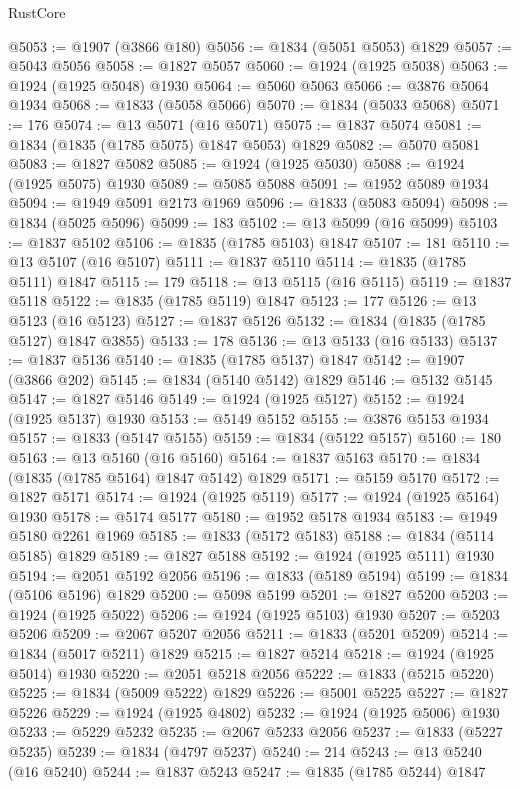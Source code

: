 \begin{lexlean}{RustCore}
\begin{coremodule}
@5053 := @1907 (@3866 @180)
@5056 := @1834 (@5051 @5053) @1829
@5057 := @5043 @5056
@5058 := @1827 @5057
@5060 := @1924 (@1925 @5038)
@5063 := @1924 (@1925 @5048) @1930
@5064 := @5060 @5063
@5066 := @3876 @5064 @1934
@5068 := @1833 (@5058 @5066)
@5070 := @1834 (@5033 @5068)
@5071 := 176
@5074 := @13 @5071 (@16 @5071)
@5075 := @1837 @5074
@5081 := @1834 (@1835 (@1785 @5075) @1847 @5053) @1829
@5082 := @5070 @5081
@5083 := @1827 @5082
@5085 := @1924 (@1925 @5030)
@5088 := @1924 (@1925 @5075) @1930
@5089 := @5085 @5088
@5091 := @1952 @5089 @1934
@5094 := @1949 @5091 @2173 @1969
@5096 := @1833 (@5083 @5094)
@5098 := @1834 (@5025 @5096)
@5099 := 183
@5102 := @13 @5099 (@16 @5099)
@5103 := @1837 @5102
@5106 := @1835 (@1785 @5103) @1847
@5107 := 181
@5110 := @13 @5107 (@16 @5107)
@5111 := @1837 @5110
@5114 := @1835 (@1785 @5111) @1847
@5115 := 179
@5118 := @13 @5115 (@16 @5115)
@5119 := @1837 @5118
@5122 := @1835 (@1785 @5119) @1847
@5123 := 177
@5126 := @13 @5123 (@16 @5123)
@5127 := @1837 @5126
@5132 := @1834 (@1835 (@1785 @5127) @1847 @3855)
@5133 := 178
@5136 := @13 @5133 (@16 @5133)
@5137 := @1837 @5136
@5140 := @1835 (@1785 @5137) @1847
@5142 := @1907 (@3866 @202)
@5145 := @1834 (@5140 @5142) @1829
@5146 := @5132 @5145
@5147 := @1827 @5146
@5149 := @1924 (@1925 @5127)
@5152 := @1924 (@1925 @5137) @1930
@5153 := @5149 @5152
@5155 := @3876 @5153 @1934
@5157 := @1833 (@5147 @5155)
@5159 := @1834 (@5122 @5157)
@5160 := 180
@5163 := @13 @5160 (@16 @5160)
@5164 := @1837 @5163
@5170 := @1834 (@1835 (@1785 @5164) @1847 @5142) @1829
@5171 := @5159 @5170
@5172 := @1827 @5171
@5174 := @1924 (@1925 @5119)
@5177 := @1924 (@1925 @5164) @1930
@5178 := @5174 @5177
@5180 := @1952 @5178 @1934
@5183 := @1949 @5180 @2261 @1969
@5185 := @1833 (@5172 @5183)
@5188 := @1834 (@5114 @5185) @1829
@5189 := @1827 @5188
@5192 := @1924 (@1925 @5111) @1930
@5194 := @2051 @5192 @2056
@5196 := @1833 (@5189 @5194)
@5199 := @1834 (@5106 @5196) @1829
@5200 := @5098 @5199
@5201 := @1827 @5200
@5203 := @1924 (@1925 @5022)
@5206 := @1924 (@1925 @5103) @1930
@5207 := @5203 @5206
@5209 := @2067 @5207 @2056
@5211 := @1833 (@5201 @5209)
@5214 := @1834 (@5017 @5211) @1829
@5215 := @1827 @5214
@5218 := @1924 (@1925 @5014) @1930
@5220 := @2051 @5218 @2056
@5222 := @1833 (@5215 @5220)
@5225 := @1834 (@5009 @5222) @1829
@5226 := @5001 @5225
@5227 := @1827 @5226
@5229 := @1924 (@1925 @4802)
@5232 := @1924 (@1925 @5006) @1930
@5233 := @5229 @5232
@5235 := @2067 @5233 @2056
@5237 := @1833 (@5227 @5235)
@5239 := @1834 (@4797 @5237)
@5240 := 214
@5243 := @13 @5240 (@16 @5240)
@5244 := @1837 @5243
@5247 := @1835 (@1785 @5244) @1847

\end{coremodule}
\end{lexlean}
